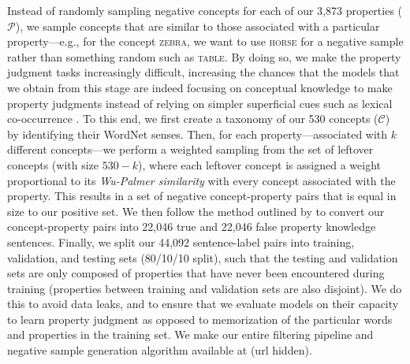 \documentclass[10pt,letterpaper]{article}
\newcommand{\concepts}{\mathcal{C}}
\newcommand{\properties}{\mathcal{P}}
\begin{document}
Instead of randomly sampling negative concepts for each of our 3{,}873 properties ($\properties$), we sample concepts that are similar to those associated with a particular property---e.g., for the concept \textsc{zebra}, we want to use \textsc{horse} for a negative sample rather than something random such as \textsc{table}.
By doing so, we make the property judgment tasks increasingly difficult, increasing the chances that the models that we obtain from this stage are indeed focusing on conceptual knowledge to make property judgments instead of relying on simpler superficial cues such as lexical co-occurrence \citep{mccoy-etal-2019-right}.  
To this end, we first create a taxonomy of our 530 concepts ($\concepts$) by identifying their WordNet \citep{miller1995wordnet} senses.
Then, for each property---associated with $k$ different concepts---we perform a weighted sampling from the set of leftover concepts (with size $530-k$), where each leftover concept is assigned a weight proportional to its \textit{Wu-Palmer similarity} \citep[a commonly used taxonomic similarity computed over the subset of wordnet taxonomy;][]{wu-palmer-1994-verb} with every concept associated with the property. 
This results in a set of negative concept-property pairs that is equal in size to our positive set.
We then follow the method outlined by \citet{bhatia2020transformer} to convert our concept-property pairs into 22{,}046 true and 22{,}046 false property knowledge sentences.
Finally, we split our 44{,}092 sentence-label pairs into training, validation, and testing sets (80/10/10 split), such that the testing and validation sets are only composed of properties that have never been encountered during training (properties between training and validation sets are also disjoint). 
We do this to avoid data leaks, and to ensure that we evaluate models on their capacity to learn property judgment as opposed to memorization of the particular words and properties in the training set. 
We make our entire filtering pipeline and negative sample generation algorithm available at (url hidden).
\end{document}

